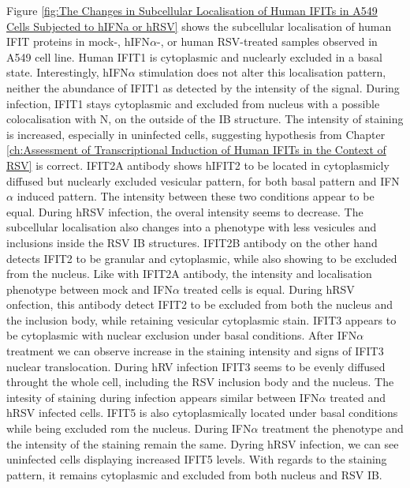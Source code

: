 Figure \ref{fig:The Changes in Subcellular Localisation of Human IFITs in A549 Cells Subjected to hIFNa or hRSV} shows the subcellular localisation of human IFIT proteins in mock-, hIFN\(\alpha\)-, or human RSV-treated samples observed in A549 cell line. Human IFIT1 is cytoplasmic and nuclearly excluded in a basal state. Interestingly, hIFN\(\alpha\) stimulation does not alter this localisation pattern, neither the abundance of IFIT1 as detected by the intensity of the signal. During infection, IFIT1 stays cytoplasmic and excluded from nucleus with a possible colocalisation with N, on the outside of the IB structure. The intensity of staining is increased, especially in uninfected cells, suggesting hypothesis from Chapter \ref{ch:Assessment of Transcriptional Induction of Human IFITs in the Context of RSV} is correct. IFIT2A antibody shows hIFIT2 to be located in cytoplasmicly diffused but nuclearly excluded vesicular pattern, for both basal pattern and IFN\(\alpha\) induced pattern. The intensity between these two conditions appear to be equal. During hRSV infection, the overal intensity seems to decrease. The subcellular localisation also changes into a phenotype with less vesicules and inclusions inside the RSV IB structures. IFIT2B antibody on the other hand detects IFIT2 to be granular and cytoplasmic, while also showing to be excluded from the nucleus. Like with IFIT2A antibody, the intensity and localisation phenotype between mock and IFN\(\alpha\) treated cells is equal. During hRSV onfection, this antibody detect IFIT2 to be excluded from both the nucleus and the inclusion body, while retaining vesicular cytoplasmic stain. IFIT3 appears to be cytoplasmic with nuclear exclusion under basal conditions. After IFN\(\alpha\) treatment we can observe increase in the staining intensity and signs of IFIT3 nuclear translocation. During hRV infection IFIT3 seems to be evenly diffused throught the whole cell, including the RSV inclusion body and the nucleus. The intesity of staining during infection appears similar between IFN\(\alpha\) treated and hRSV infected cells. IFIT5 is also cytoplasmically located under basal conditions while being excluded rom the nucleus. During IFN\(\alpha\) treatment the phenotype and the intensity of the staining remain the same. Dyring hRSV infection, we can see uninfected cells displaying increased IFIT5 levels. With regards to the staining pattern, it remains cytoplasmic and excluded from both nucleus and RSV IB.

